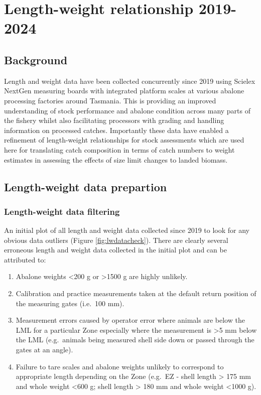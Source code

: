 \documentclass[
]{article}
\providecommand{\tightlist}{%
  \setlength{\itemsep}{0pt}\setlength{\parskip}{0pt}}
\begin{document}
\section{Length-weight relationship 2019-2024}\label{length-weight-relationship-2019-2024}

\subsection{Background}\label{background-1}

Length and weight data have been collected concurrently since 2019 using Scielex NextGen measuring boards with integrated platform scales at various abalone processing factories around Tasmania. This is providing an improved understanding of stock performance and abalone condition across many parts of the fishery whilst also facilitating processors with grading and handling information on processed catches. Importantly these data have enabled a refinement of length-weight relationships for stock assessments which are used here for translating catch composition in terms of catch numbers to weight estimates in assessing the effects of size limit changes to landed biomass.

\subsection{Length-weight data prepartion}\label{length-weight-data-prepartion}

\subsubsection{Length-weight data filtering}\label{length-weight-data-filtering}

An initial plot of all length and weight data collected since 2019 to look for any obvious data outliers (Figure \ref{fig:lwdatacheck}). There are clearly several erroneous length and weight data collected in the initial plot and can be attributed to:

\begin{enumerate}
\def\labelenumi{\arabic{enumi}.}
\tightlist
\item
  Abalone weights \textless200 g or \textgreater1500 g are highly unlikely.
\item
  Calibration and practice measurements taken at the default return position of
  the measuring gates (i.e.~100 mm).
\item
  Measurement errors caused by operator error where animals are below the LML for a particular
  Zone especially where the measurement is \textgreater5 mm below the LML (e.g.~animals being measured
  shell side down or passed through the gates at an angle).
\item
  Failure to tare scales and abalone weights unlikely to correspond to appropriate
  length depending on the Zone (e.g.~EZ - shell length \textgreater{} 175 mm and whole weight \textless600 g; shell length \textgreater{} 180 mm and whole weight \textless1000 g).
\end{enumerate}
\end{document}
